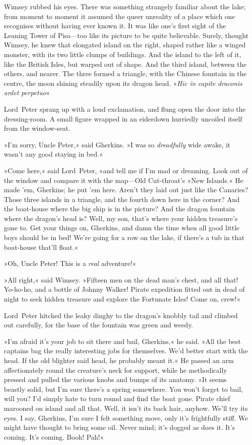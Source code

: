 Wimsey rubbed his eyes. There was something strangely familiar about the lake; from moment to moment it assumed the queer unreality of a place which one recognises without having ever known it. It was like one's first sight of the Leaning Tower of Pisa—too like its picture to be quite believable. Surely, thought Wimsey, he knew that elongated island on the right, shaped rather like a winged monster, with its two little clumps of buildings. And the island to the left of it, like the British Isles, but warped out of shape. And the third island, between the others, and nearer. The three formed a triangle, with the Chinese fountain in the centre, the moon shining steadily upon its dragon head. »\textit{Hic in capite draconis ardet perpetuo}\longdash«

Lord~Peter sprang up with a loud exclamation, and flung open the door into the dressing-room. A small figure wrapped in an eiderdown hurriedly uncoiled itself from the window-seat.

»I'm sorry, Uncle Peter,« said Gherkins. »I was so \textit{dreadfully} wide awake, it wasn't any good staying in bed.«

»Come here,« said Lord~Peter, »and tell me if I'm mad or dreaming. Look out of the window and compare it with the map—Old Cut-throat's »New Islands.« He made 'em, Gherkins; he put 'em here. Aren't they laid out just like the Canaries? Those three islands in a triangle, and the fourth down here in the corner? And the boat-house where the big ship is in the picture? And the dragon fountain where the dragon's head is? Well, my son, that's where your hidden treasure's gone to. Get your things on, Gherkins, and damn the time when all good little boys should be in bed! We're going for a row on the lake, if there's a tub in that boat-house that'll float.«

»Oh, Uncle Peter! This is a \textit{real} adventure!«

»All right,« said Wimsey. »Fifteen men on the dead man's chest, and all that! Yo-ho-ho, and a bottle of Johnny Walker! Pirate expedition fitted out in dead of night to seek hidden treasure and explore the Fortunate Isles! Come on, crew!«

\divider
Lord~Peter hitched the leaky dinghy to the dragon's knobbly tail and climbed out carefully, for the base of the fountain was green and weedy.

»I'm afraid it's your job to sit there and bail, Gherkins,« he said. »All the best captains bag the really interesting jobs for themselves. We'd better start with the head. If the old blighter said head, he probably meant it.« He passed an arm affectionately round the creature's neck for support, while he methodically pressed and pulled the various knobs and bumps of its anatomy. »It seems beastly solid, but I'm sure there's a spring somewhere. You won't forget to bail, will you? I'd simply hate to turn round and find the boat gone. Pirate chief marooned on island and all that. Well, it isn't its back hair, anyhow. We'll try its eyes. I say, Gherkins, I'm sure I felt something move, only it's frightfully stiff. We might have thought to bring some oil. Never mind; it's dogged as does it. It's coming. It's coming. Booh! Pah!«

